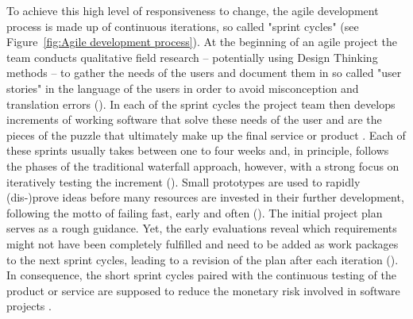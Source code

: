 To achieve this high level of responsiveness to change, the agile development process is made up of continuous iterations, so called "sprint cycles" (see Figure~\ref{fig:Agile development process}). At the beginning of an agile project the team conducts qualitative field research – potentially using Design Thinking methods – to gather the needs of the users and document them in so called "user stories" in the language of the users in order to avoid misconception and translation errors (\cite{Wirdemann2017, Mergel2016}). In each of the sprint cycles the project team then develops increments of working software that solve these needs of the user and are the pieces of the puzzle that ultimately make up the final service or product \parencite{Schwaber2020}. Each of these sprints usually takes between one to four weeks and, in principle, follows the phases of the traditional waterfall approach, however, with a strong focus on iteratively testing the increment (\cite{Schwaber2020, Hughes2013}). Small prototypes are used to rapidly (dis-)prove ideas before many resources are invested in their further development, following the motto of failing fast, early and often (\cite{Mergel2016, Boehmer2017}). The initial project plan serves as a rough guidance. Yet, the early evaluations reveal which requirements might not have been completely fulfilled and need to be added as work packages to the next sprint cycles, leading to a revision of the plan after each iteration (\cite{Mergel2016}). In consequence, the short sprint cycles paired with the continuous testing of the product or service are supposed to reduce the monetary risk involved in software projects \parencite{Schwaber2020}.

